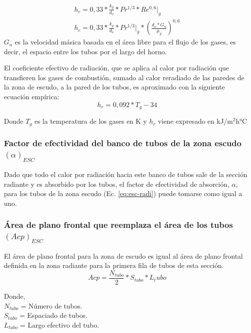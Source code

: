 \begin{equation}
\label{eq:hc}
\begin{gathered}
h_c = 0,33 * \frac{k_g}{d_o} *Pr^{1/3} *Re^{0,6} |_g\\
h_c = 0,33 * \frac{k_g}{d_o} *Pr^{1/3}|_g*(\frac{d_o*G_n}{\mu_g})^{0,6}
\end{gathered}
\end{equation}
$G_n$ es la velocidad másica basada en el área libre para el flujo de los gases, es decir, el espacio entre los tubos por el largo del horno.
\par El coeficiente efectivo de radiación, que se aplica al calor por radiación que transfieren los gases de combustión, sumado al calor reradiado de las paredes de la zona de escudo, a la pared de los tubos, es aproximado con la siguiente ecuación empírica:
\begin{equation}
\label{eq:hr}
h_r = 0,092*T_g - 34  
\end{equation}
\par Donde $T_g$ es la temperatura de los gases en K y $h_r$ viene expresado en kJ/m$^2$h°C

\subsubsection{Factor de efectividad del banco de tubos de la zona escudo $(\alpha)_{ESC}$}
\par Dado que todo el calor por radiación hacia este banco de tubos sale de la sección radiante y es absorbido por los tubos, el factor de efectividad de absorción, $\alpha$, para los tubos de la zona escudo (Ec. \ref{eq:esc-radi}) puede tomarse como igual a uno.

\subsubsection{Área de plano frontal que reemplaza el área de los tubos $(Acp)_{ESC}$}
\par El área de plano frontal para la zona de escudo es igual al área de plano frontal definida en la zona radiante para la primera fila de tubos de esta sección.
\begin{equation}
Acp = \frac{N_{tubo}}{2} * S_{tubo} * {L_tubo}
\end{equation}
\par Donde, \\
$N_{tubo}$ = Número de tubos. \\
$S_{tubo}$ = Espaciado de tubos. \\
$L_{tubo}$ = Largo efectivo del tubo.

